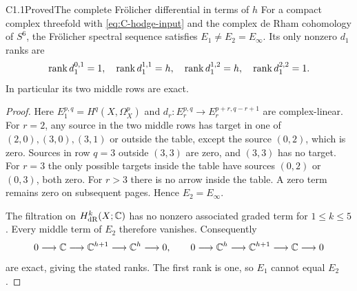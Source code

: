 \begin{claim}{C1.1}{Proved}{The complete Fr\"olicher differential in terms of $h$}
For a compact complex threefold with \eqref{eq:C-hodge-input} and the
complex de Rham cohomology of $S^6$, the Fr\"olicher spectral sequence
satisfies $E_1\ne E_2=E_\infty$.  Its only nonzero $d_1$ ranks are
\[
\operatorname{rank} d_1^{0,1}=1,\quad \operatorname{rank} d_1^{1,1}=h,\quad
\operatorname{rank} d_1^{1,2}=h,\quad \operatorname{rank} d_1^{2,2}=1.
\]
In particular its two middle rows are exact.
\end{claim}
\begin{proof}
Here $E_1^{p,q}=H^q(X,\Omega_X^p)$ and
$d_r:E_r^{p,q}\longrightarrow E_r^{p+r,q-r+1}$ are complex-linear.
For $r=2$, any source in the two middle rows has target in one of
$(2,0),(3,0),(3,1)$ or outside the table, except the source $(0,2)$,
which is zero.  Sources in row $q=3$ outside $(3,3)$ are zero, and
$(3,3)$ has no target.  For $r=3$ the only possible targets inside the
table have sources $(0,2)$ or $(0,3)$, both zero.  For $r>3$ there is
no arrow inside the table.  A zero term remains zero on subsequent
pages.  Hence $E_2=E_\infty$.

The filtration on $H^k_{\mathrm{dR}}(X;\mathbb C)$ has no nonzero associated
graded term for $1\le k\le5$.  Every middle term of $E_2$ therefore
vanishes.  Consequently
\[
0\longrightarrow\mathbb C\longrightarrow\mathbb C^{h+1}
\longrightarrow\mathbb C^h\longrightarrow0,
\qquad
0\longrightarrow\mathbb C^h\longrightarrow\mathbb C^{h+1}
\longrightarrow\mathbb C\longrightarrow0
\]
are exact, giving the stated ranks.  The first rank is one, so $E_1$
cannot equal $E_2$.
\end{proof}

